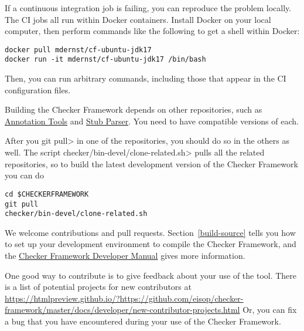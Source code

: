 If a continuous integration job is failing, you can reproduce the problem locally.
The CI jobs all run within Docker containers.
Install Docker on your local computer, then perform commands like the
following to get a shell within Docker:

\begin{Verbatim}
docker pull mdernst/cf-ubuntu-jdk17
docker run -it mdernst/cf-ubuntu-jdk17 /bin/bash
\end{Verbatim}

Then, you can run arbitrary commands, including those that appear in the
CI configuration files.



Building the Checker Framework depends on other repositories, such as
\href{https://github.com/eisop/annotation-tools/}{Annotation Tools} and
\href{https://github.com/eisop/stubparser/}{Stub Parser}.
You need to have compatible versions of each.

After you \<git pull> in one of the repositories, you should do so in the
others as well.  The script \<checker/bin-devel/clone-related.sh> pulls all the
related repositories, so to build the latest development version of the
Checker Framework you can do

\begin{Verbatim}
cd $CHECKERFRAMEWORK
git pull
checker/bin-devel/clone-related.sh
\end{Verbatim}



We welcome contributions and pull requests.  Section~\ref{build-source}
tells you how to set up your development environment to compile the Checker
Framework, and the
\href{https://htmlpreview.github.io/?https://github.com/eisop/checker-framework/master/docs/developer/developer-manual.html}{Checker
  Framework Developer Manual} gives more information.

One good way to contribute is to give feedback about your use of the tool.
There is a list
of potential projects for new contributors at
\url{https://htmlpreview.github.io/?https://github.com/eisop/checker-framework/master/docs/developer/new-contributor-projects.html}
Or, you can fix a bug that
you have encountered during your use of the Checker Framework.



